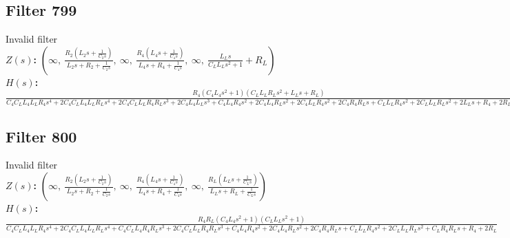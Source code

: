 \documentclass{article}
\begin{document}
\subsection*{Filter 799}
Invalid filter \\ 
\textbf{$Z(s)$:} $\left( \infty, \  \frac{R_{2} \left(L_{2} s + \frac{1}{C_{2} s}\right)}{L_{2} s + R_{2} + \frac{1}{C_{2} s}}, \  \infty, \  \frac{R_{4} \left(L_{4} s + \frac{1}{C_{4} s}\right)}{L_{4} s + R_{4} + \frac{1}{C_{4} s}}, \  \infty, \  \frac{L_{L} s}{C_{L} L_{L} s^{2} + 1} + R_{L}\right)$ \\ 
\textbf{$H(s)$:} $\frac{R_{4} \left(C_{4} L_{4} s^{2} + 1\right) \left(C_{L} L_{L} R_{L} s^{2} + L_{L} s + R_{L}\right)}{C_{4} C_{L} L_{4} L_{L} R_{4} s^{4} + 2 C_{4} C_{L} L_{4} L_{L} R_{L} s^{4} + 2 C_{4} C_{L} L_{L} R_{4} R_{L} s^{3} + 2 C_{4} L_{4} L_{L} s^{3} + C_{4} L_{4} R_{4} s^{2} + 2 C_{4} L_{4} R_{L} s^{2} + 2 C_{4} L_{L} R_{4} s^{2} + 2 C_{4} R_{4} R_{L} s + C_{L} L_{L} R_{4} s^{2} + 2 C_{L} L_{L} R_{L} s^{2} + 2 L_{L} s + R_{4} + 2 R_{L}}$ \\ 
\subsection*{Filter 800}
Invalid filter \\ 
\textbf{$Z(s)$:} $\left( \infty, \  \frac{R_{2} \left(L_{2} s + \frac{1}{C_{2} s}\right)}{L_{2} s + R_{2} + \frac{1}{C_{2} s}}, \  \infty, \  \frac{R_{4} \left(L_{4} s + \frac{1}{C_{4} s}\right)}{L_{4} s + R_{4} + \frac{1}{C_{4} s}}, \  \infty, \  \frac{R_{L} \left(L_{L} s + \frac{1}{C_{L} s}\right)}{L_{L} s + R_{L} + \frac{1}{C_{L} s}}\right)$ \\ 
\textbf{$H(s)$:} $\frac{R_{4} R_{L} \left(C_{4} L_{4} s^{2} + 1\right) \left(C_{L} L_{L} s^{2} + 1\right)}{C_{4} C_{L} L_{4} L_{L} R_{4} s^{4} + 2 C_{4} C_{L} L_{4} L_{L} R_{L} s^{4} + C_{4} C_{L} L_{4} R_{4} R_{L} s^{3} + 2 C_{4} C_{L} L_{L} R_{4} R_{L} s^{3} + C_{4} L_{4} R_{4} s^{2} + 2 C_{4} L_{4} R_{L} s^{2} + 2 C_{4} R_{4} R_{L} s + C_{L} L_{L} R_{4} s^{2} + 2 C_{L} L_{L} R_{L} s^{2} + C_{L} R_{4} R_{L} s + R_{4} + 2 R_{L}}$ \\ 
\end{document}
